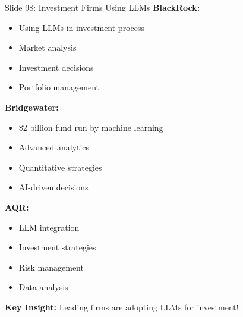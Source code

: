 \documentclass[8pt]{beamer}
\begin{document}
	\begin{frame}{Slide 98: Investment Firms Using LLMs}
		\fontsize{6.5}{7.5}\selectfont
		\textbf{BlackRock:}
		\begin{itemize}
			\item Using LLMs in investment process
			\item Market analysis
			\item Investment decisions
			\item Portfolio management
		\end{itemize}
		
		\vspace{0.1cm}
		\textbf{Bridgewater:}
		\begin{itemize}
			\item \$2 billion fund run by machine learning
			\item Advanced analytics
			\item Quantitative strategies
			\item AI-driven decisions
		\end{itemize}
		
		\vspace{0.1cm}
		\textbf{AQR:}
		\begin{itemize}
			\item LLM integration
			\item Investment strategies
			\item Risk management
			\item Data analysis
		\end{itemize}
		
		\textcolor{myblue}{\textbf{Key Insight:}} Leading firms are adopting LLMs for investment!
	\end{frame}
	
\end{document}

